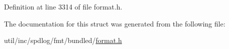 Definition at line 3314 of file format.\+h.



The documentation for this struct was generated from the following file\+:\begin{DoxyCompactItemize}
\item 
util/inc/spdlog/fmt/bundled/\hyperlink{format_8h}{format.\+h}\end{DoxyCompactItemize}
